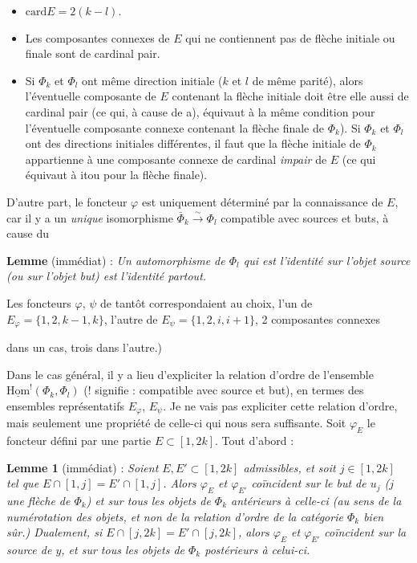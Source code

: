 \documentclass[11pt]{article}
\newcommand{\printedpage}[1]{\marginpar{\footnotesize p.~#1}}
\newcommand{\msp}[1]{\marginpar{\footnotesize [#1]}}
\newcommand{\card}{\mathrm{card}}
\newcommand{\uHom}{\underline{\mathrm{Hom}}}
\begin{document}
\begin{itemize}
\item[a)] $\card E=2(k-l)$.
\item[b)] Les composantes connexes de $E$ qui ne contiennent pas de flèche initiale ou finale sont de cardinal pair.
\item[c)] Si $\Phi_k$ et $\Phi_l$ ont même direction initiale ($k$ et $l$ de même parité), alors l'éventuelle composante de $E$ contenant la flèche initiale doit être elle aussi de cardinal pair (ce qui, à cause de a), équivaut à la même condition pour l'éventuelle composante connexe contenant la flèche finale de $\Phi_k$). Si $\Phi_k$ et $\Phi_l$ ont des directions initiales différentes, il faut que la flèche initiale de $\Phi_k$ appartienne à une composante connexe de cardinal \textit{impair} de $E$ (ce qui équivaut à itou pour la flèche finale).
\end{itemize}

D'autre part, le foncteur $\varphi$ est uniquement déterminé par la connaissance de $E$, car il y a un \textit{unique} isomorphisme $\bar{\Phi}_k\xrightarrow{\sim}\Phi_l$ compatible avec sources et buts, à cause du

\textbf{Lemme} (immédiat) : \textit{Un automorphisme de $\Phi_l$ qui est l'identité sur l'objet source (ou sur l'objet but) est l'identité partout.}

Les foncteurs $\varphi$, $\psi$ de tantôt correspondaient au choix, l'un de $E_\varphi=\{1,2,k-1,k\}$, l'autre de $E_\psi=\{1,2,i,i+1\}$, 2 composantes connexes

\msp{page 20}
dans un cas, trois dans l'autre.) %


\printedpage{13}

Dans le cas général, il y a lieu d'expliciter la relation d'ordre de l'ensemble $\uHom^{!}(\Phi_k,\Phi_l)$ (! signifie : compatible avec source et but), en termes des ensembles représentatifs $E_\varphi$, $E_\psi$. Je ne vais pas expliciter cette relation d'ordre, mais seulement une propriété de celle-ci qui nous sera suffisante. Soit $\varphi_E$ le foncteur défini par une partie $E\subset[1,2k]$. Tout d'abord :

\textbf{Lemme 1} (immédiat) : \textit{Soient $E,E'\subset[1,2k]$ admissibles, et soit $j\in[1,2k]$ tel que $E\cap[1,j]=E'\cap[1,j]$. Alors $\varphi_E$ et $\varphi_{E'}$ coïncident sur le but de $u_j$ ($j$ une flèche de $\Phi_k$) et sur tous les objets de $\Phi_k$ antérieurs à celle-ci (au sens de la numérotation des objets, et non de la relation d'ordre de la catégorie $\Phi_k$ bien sûr.) Dualement, si $E\cap[j,2k]=E'\cap[j,2k]$, alors $\varphi_E$ et $\varphi_{E'}$ coïncident sur la source de $y$, et sur tous les objets de $\Phi_k$ postérieurs à celui-ci.} %
\end{document}
